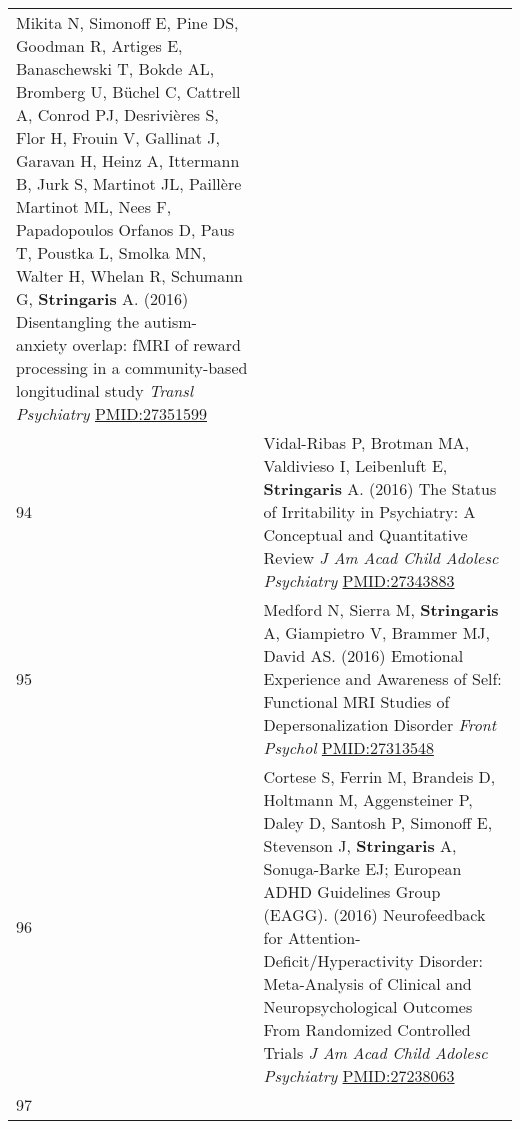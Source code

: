 \documentclass[
]{article}
\begin{document}
\begin{longtable}[]{@{}ll@{}}
\begin{minipage}[t]{0.94\columnwidth}
Mikita N, Simonoff E, Pine DS, Goodman R, Artiges E, Banaschewski T,
Bokde AL, Bromberg U, Büchel C, Cattrell A, Conrod PJ, Desrivières S,
Flor H, Frouin V, Gallinat J, Garavan H, Heinz A, Ittermann B, Jurk S,
Martinot JL, Paillère Martinot ML, Nees F, Papadopoulos Orfanos D, Paus
T, Poustka L, Smolka MN, Walter H, Whelan R, Schumann G,
\textbf{Stringaris} A. (2016) Disentangling the autism-anxiety overlap:
fMRI of reward processing in a community-based longitudinal study
\emph{Transl Psychiatry} \url{PMID:27351599}\strut
\end{minipage}\tabularnewline
\begin{minipage}[t]{0.01\columnwidth}\raggedright
94\strut
\end{minipage} & \begin{minipage}[t]{0.94\columnwidth}\raggedright
Vidal-Ribas P, Brotman MA, Valdivieso I, Leibenluft E,
\textbf{Stringaris} A. (2016) The Status of Irritability in Psychiatry:
A Conceptual and Quantitative Review \emph{J Am Acad Child Adolesc
Psychiatry} \url{PMID:27343883}\strut
\end{minipage}\tabularnewline
\begin{minipage}[t]{0.01\columnwidth}\raggedright
95\strut
\end{minipage} & \begin{minipage}[t]{0.94\columnwidth}\raggedright
Medford N, Sierra M, \textbf{Stringaris} A, Giampietro V, Brammer MJ,
David AS. (2016) Emotional Experience and Awareness of Self: Functional
MRI Studies of Depersonalization Disorder \emph{Front Psychol}
\url{PMID:27313548}\strut
\end{minipage}\tabularnewline
\begin{minipage}[t]{0.01\columnwidth}\raggedright
96\strut
\end{minipage} & \begin{minipage}[t]{0.94\columnwidth}\raggedright
Cortese S, Ferrin M, Brandeis D, Holtmann M, Aggensteiner P, Daley D,
Santosh P, Simonoff E, Stevenson J, \textbf{Stringaris} A, Sonuga-Barke
EJ; European ADHD Guidelines Group (EAGG). (2016) Neurofeedback for
Attention-Deficit/Hyperactivity Disorder: Meta-Analysis of Clinical and
Neuropsychological Outcomes From Randomized Controlled Trials \emph{J Am
Acad Child Adolesc Psychiatry} \url{PMID:27238063}\strut
\end{minipage}\tabularnewline
\begin{minipage}[t]{0.01\columnwidth}\raggedright
97\strut
\end{minipage} & \begin{minipage}[t]{0.94\columnwidth}\raggedright

\end{minipage}
\end{longtable}
\end{document}
